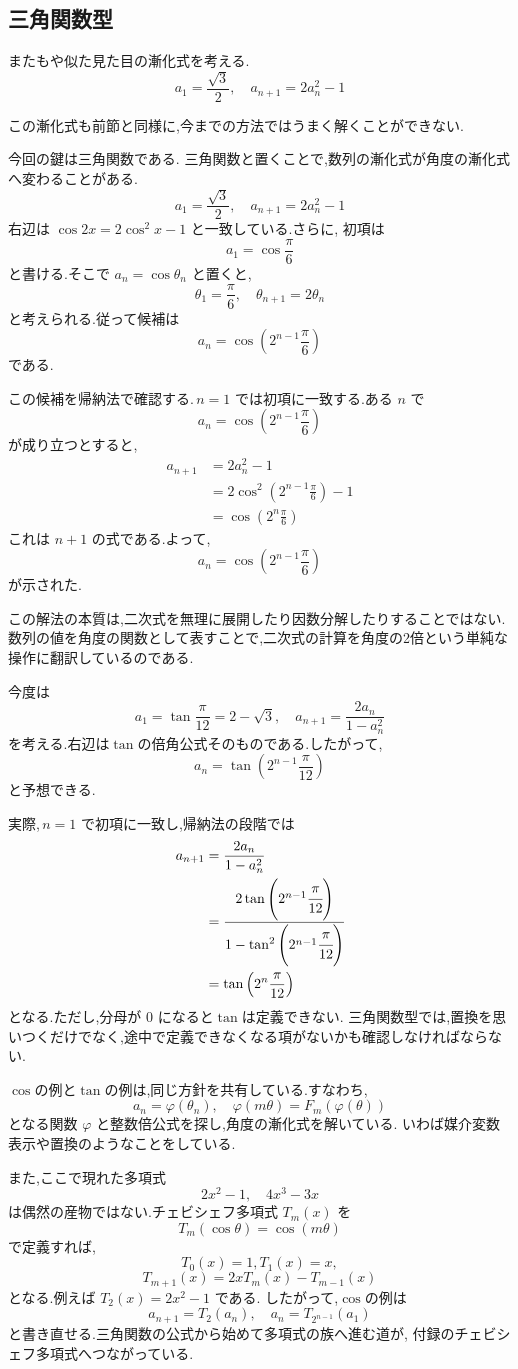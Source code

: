 \subsection{三角関数型}
またもや似た見た目の漸化式を考える.
\[
  a_1=\frac{\sqrt{3}}{2},\quad a_{n+1}=2a_n^2-1
\]

この漸化式も前節と同様に,今までの方法ではうまく解くことができない.

今回の鍵は三角関数である.
三角関数と置くことで,数列の漸化式が角度の漸化式へ変わることがある.
\[
  a_1=\frac{\sqrt{3}}{2},\quad a_{n+1}=2a_n^2-1
\]
右辺は $\cos 2x=2\cos^2x-1$ と一致している.さらに,
初項は
\[
  a_1=\cos\frac{\pi}{6}
\]
と書ける.そこで $a_n=\cos\theta_n$ と置くと,
\[
  \theta_1=\frac{\pi}{6},
  \quad
  \theta_{n+1}=2\theta_n
\]
と考えられる.従って候補は
\[
  a_n=\cos\left(2^{n-1}\frac{\pi}{6}\right)
\]
である.

この候補を帰納法で確認する.\,$n=1$ では初項に一致する.ある $n$ で
\[
  a_n=\cos\left(2^{n-1}\frac{\pi}{6}\right)
\]
が成り立つとすると,
\begin{align*}
  a_{n+1}
    &=2a_n^2-1\\
    &=2\cos^2\left(2^{n-1}\frac{\pi}{6}\right)-1\\
    &=\cos\left(2^n\frac{\pi}{6}\right)
\end{align*}
これは $n+1$ の式である.よって,
\[
  a_n=\cos\left(2^{n-1}\frac{\pi}{6}\right)
\]
が示された.

この解法の本質は,二次式を無理に展開したり因数分解したりすることではない.
数列の値を角度の関数として表すことで,二次式の計算を角度の2倍という単純な操作に翻訳しているのである.

今度は
\[
  a_1=\tan\frac{\pi}{12}=2-\sqrt{3},
  \quad
  a_{n+1}=\frac{2a_n}{1-a_n^2}
\]
を考える.右辺は$\tan$の倍角公式そのものである.したがって,
\[
  a_n=\tan\left(2^{n-1}\frac{\pi}{12}\right)
\]
と予想できる.

実際,\,$n=1$ で初項に一致し,帰納法の段階では
\begin{align*}
  a_{n+1}
    &=\frac{2a_n}{1-a_n^2}\\
    &=\cfrac{2\tan\left(2^{n-1}\cfrac{\pi}{12}\right)}
            {1-\tan^2\left(2^{n-1}\cfrac{\pi}{12}\right)}\\
    &=\tan\left(2^n\frac{\pi}{12}\right)
\end{align*}
となる.ただし,分母が $0$ になると$\tan$は定義できない.
三角関数型では,置換を思いつくだけでなく,途中で定義できなくなる項がないかも確認しなければならない.

$\cos$の例と$\tan$の例は,同じ方針を共有している.すなわち,
\[
  a_n=\varphi(\theta_n),
  \quad
  \varphi(m\theta)=F_m(\varphi(\theta))
\]
となる関数 $\varphi$ と整数倍公式を探し,角度の漸化式を解いている.
いわば媒介変数表示や置換のようなことをしている.

また,ここで現れた多項式
\[
  2x^2-1,
  \quad
  4x^3-3x
\]
は偶然の産物ではない.チェビシェフ多項式 $T_m(x)$ を
\[
  T_m(\cos\theta)=\cos(m\theta)
\]
で定義すれば,
\[
  T_0(x)=1,  T_1(x)=x,
\]
\[
  T_{m+1}(x)=2xT_m(x)-T_{m-1}(x)
\]
となる.例えば $T_2(x)=2x^2-1$ である.
したがって,$\cos$の例は
\[
  a_{n+1}=T_2(a_n),
  \quad
  a_n=T_{2^{n-1}}(a_1)
\]
と書き直せる.三角関数の公式から始めて多項式の族へ進む道が,
付録のチェビシェフ多項式へつながっている.
